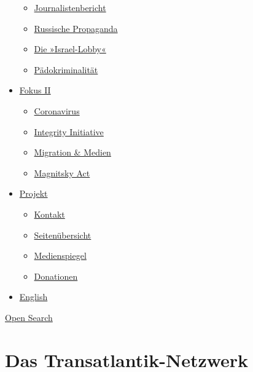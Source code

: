 \begin{itemize}
  \begin{itemize}
  \tightlist
  \item
    \href{https://swprs.org/bericht-eines-journalisten/}{Journalistenbericht}
  \item
    \href{https://swprs.org/russische-propaganda/}{Russische Propaganda}
  \item
    \href{https://swprs.org/die-israel-lobby-fakten-und-mythen/}{Die
    »Israel-Lobby«}
  \item
    \href{https://swprs.org/geopolitik-und-paedokriminalitaet/}{Pädokriminalität}
  \end{itemize}
\item
  \href{https://swprs.org/migration-und-medien/}{Fokus II}

  \begin{itemize}
  \tightlist
  \item
    \href{https://swprs.org/covid-19-hinweis-ii/}{Coronavirus}
  \item
    \href{https://swprs.org/die-integrity-initiative/}{Integrity
    Initiative}
  \item
    \href{https://swprs.org/migration-und-medien/}{Migration \& Medien}
  \item
    \href{https://swprs.org/der-fall-magnitsky/}{Magnitsky Act}
  \end{itemize}
\item
  \href{https://swprs.org/kontakt/}{Projekt}

  \begin{itemize}
  \tightlist
  \item
    \href{https://swprs.org/kontakt/}{Kontakt}
  \item
    \href{https://swprs.org/uebersicht/}{Seitenübersicht}
  \item
    \href{https://swprs.org/medienspiegel/}{Medienspiegel}
  \item
    \href{https://swprs.org/donationen/}{Donationen}
  \end{itemize}
\item
  \href{https://swprs.org/contact/}{English}
\end{itemize}

\protect\hyperlink{}{Open Search}

\hypertarget{das-transatlantik-netzwerk}{%
\section{Das Transatlantik-Netzwerk}\label{das-transatlantik-netzwerk}}

